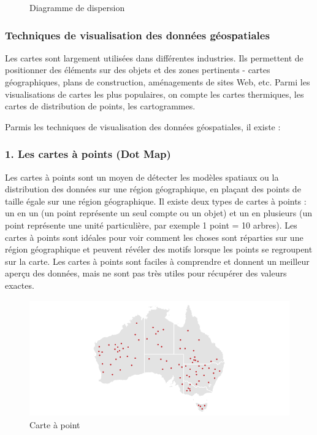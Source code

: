 \documentclass[french, a4paper, 12pt]{report}
\begin{document}
\begin{figure}[!htb]
\begin{minipage}{0.35\linewidth}
    \caption{Diagramme de dispersion}
 \label{fig:4.6}
\end{minipage}
\end{figure}

\subsubsection{Techniques de visualisation des données géospatiales}
Les cartes sont largement utilisées dans différentes industries. Ils permettent de positionner des éléments sur des objets et des zones pertinents - cartes géographiques, plans de construction, aménagements de sites Web, etc. Parmi les visualisations de cartes les plus populaires, on compte les cartes thermiques, les cartes de distribution de points, les cartogrammes.

Parmis les techniques de visualisation des données géospatiales, il existe : 
\subsubsection{1. Les cartes à points (Dot Map)}
Les cartes à points sont un moyen de détecter les modèles spatiaux ou la distribution des données sur une région géographique, en plaçant des points de taille égale sur une région géographique.
Il existe deux types de cartes à points : un en un (un point représente un seul compte ou un objet) et un en plusieurs (un point représente une unité particulière, par exemple 1 point = 10 arbres).
Les cartes à points sont idéales pour voir comment les choses sont réparties sur une région géographique et peuvent révéler des motifs lorsque les points se regroupent sur la carte. Les cartes à points sont faciles à comprendre et donnent un meilleur aperçu des données, mais ne sont pas très utiles pour récupérer des valeurs exactes.
\begin{figure}[!ht]
    \centering
    \includegraphics[height=5cm]{images/dot_map.png}
    \caption{Carte à point}
    \label{fig:2.7}
\end{figure}
\end{document}

